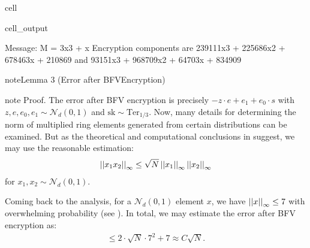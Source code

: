 \documentclass[letterpaper,10pt,english]{jupyterBook}
\begin{document}
\begin{sphinxuseclass}{cell}
\begin{sphinxVerbatimOutput}
\begin{sphinxuseclass}{cell_output}
\begin{sphinxVerbatim}[commandchars=\\\{\}]
Message: M = 3x\PYGZca{}3 + x
Encryption components are 239111x\PYGZca{}3 + 225686x\PYGZca{}2 + 678463x + 210869 
and 93151x\PYGZca{}3 + 968709x\PYGZca{}2 + 64703x + 834909
\end{sphinxVerbatim}

\end{sphinxuseclass}\end{sphinxVerbatimOutput}

\end{sphinxuseclass}
\begin{DUlineblock}{0em}
\item[] 
\end{DUlineblock}
\label{Thesis:error-after-BFV-encryption}
\begin{sphinxadmonition}{note}{Lemma 3 (Error after BFV\sphinxhyphen{}Encryption)}
\end{sphinxadmonition}

\begin{sphinxadmonition}{note}
\sphinxAtStartPar
Proof. The error after BFV encryption is precisely \(-z \cdot e + e_1 + e_0 \cdot s\) with \(z,e,e_0,e_1 \sim \mathcal N_d(0,1)\) and \(\mathrm{sk} \sim \mathrm{Ter}_{1/3}\).
Now, many details for determining the norm of multiplied ring elements generated from certain distributions can be examined.
But as the theoretical and computational conclusions in {\hyperref[\detokenize{Thesis:conclusion-on-delta-r}]{}} suggest, we may use the reasonable estimation:
\begin{equation*}
\begin{split}\left\lvert\left\lvert x_1x_2 \right\rvert\right\rvert_\infty \le \sqrt{N}\left\lvert\left\lvert x_1 \right\rvert\right\rvert_\infty\left\lvert\left\lvert x_2 \right\rvert\right\rvert_\infty\end{split}
\end{equation*}
\sphinxAtStartPar
for \(x_1,x_2 \sim \mathcal N_d(0,1)\).

\sphinxAtStartPar
Coming back to the analysis, for a \(\mathcal N_d(0,1)\) element \(x\), we have \(\left\lvert\left\lvert x \right\rvert\right\rvert_\infty \le 7\) with overwhelming probability (see {\hyperref[\detokenize{Thesis:sampling-bound}]{}}).
In total, we may estimate the error after BFV encryption as:
\begin{equation*}
\begin{split}\le 2 \cdot \sqrt{N} \cdot 7^2 + 7 \approx C \sqrt{N}.\end{split}
\end{equation*}\end{sphinxadmonition}
\end{document}
